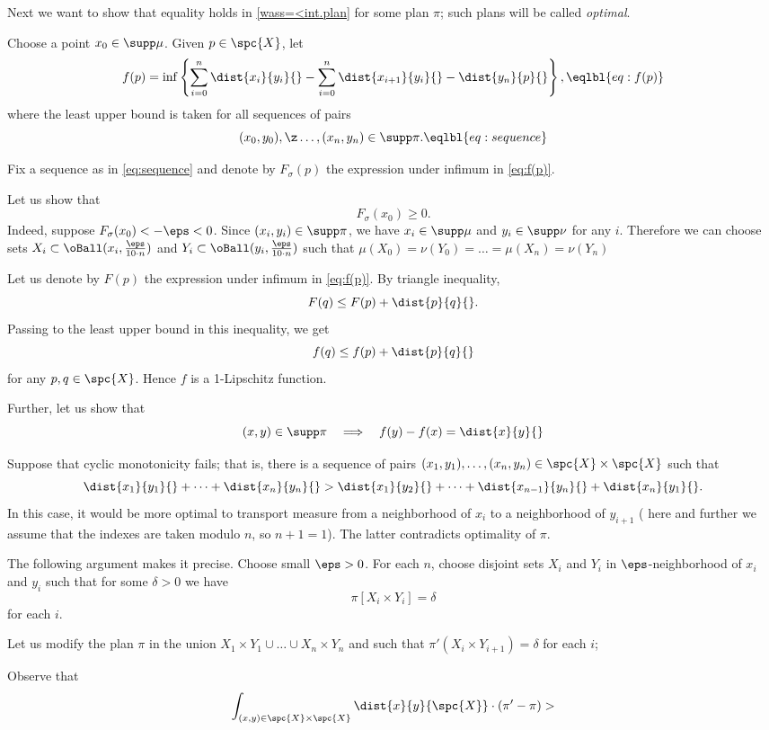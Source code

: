 Next we want to show that equality holds in \ref{wass=<int.plan} for some plan $\pi$; such plans will be called \emph{optimal}.


Choose a point $x_0\in \supp\mu$.
Given  $p\in \spc{X}$,
let
\[f(p)=\inf\left\{\sum_{i=0}^n\dist{x_i}{y_i}{}-\sum_{i=0}^n\dist{x_{i+1}}{y_i}{}-\dist{y_n}{p}{}\right\},
\eqlbl{eq:f(p)}\]
where the least upper bound is taken for all sequences of pairs 
\[(x_0,y_0),\z\dots,(x_n,y_n)\in \supp\pi.\eqlbl{eq:sequence}\]

Fix a sequence as in \ref{eq:sequence} and  denote by $F_\sigma(p)$ the expression under infimum in \ref{eq:f(p)}.

Let us show that 
\[F_\sigma(x_0)\ge 0.\]
Indeed, suppose $F_\sigma(x_0)<-\eps<0$.
Since $(x_i,y_i)\in \supp\pi$, we have $x_i\in\supp\mu$ and $y_i\in\supp\nu$ for any $i$.
Therefore we can choose sets $X_i\subset \oBall(x_i,\tfrac{\eps}{10\cdot n})$ and $Y_i\subset \oBall(y_i,\tfrac{\eps}{10\cdot n})$ such that 
$\mu(X_0)=\nu(Y_0)=\dots=\mu(X_n)=\nu(Y_n)$



Let us denote by $F(p)$ the expression under infimum in \ref{eq:f(p)}.
By triangle inequality, 
\[F(q)\le F(p)+\dist{p}{q}{}.\]
Passing to the least upper bound in this inequality, we get
\[f(q)\le f(p)+\dist{p}{q}{}\]
for any $p,q\in\spc{X}$.
Hence $f$ is a 1-Lipschitz function.

Further, let us show that
\[(x,y)\in\supp\pi
\quad\Longrightarrow\quad
f(y)-f(x)=\dist{x}{y}{}\]





Suppose that cyclic monotonicity fails;
that is, there is a sequence of pairs $(x_1,y_1),\dots,(x_n,y_n)\in\spc{X}\times\spc{X}$ such that
\[\dist{x_1}{y_1}{}+\dots+\dist{x_n}{y_n}{}
>
\dist{x_1}{y_2}{}+\dots+\dist{x_{n-1}}{y_n}{}+\dist{x_{n}}{y_1}{}.\]
In this case, it would be more optimal to transport measure from a neighborhood of $x_i$ to a neighborhood of $y_{i+1}$ (
here and further we assume that the indexes are taken modulo $n$, so $n+1=1$).
The latter contradicts optimality of $\pi$.

The following argument makes it precise.
Choose small $\eps>0$.
For each $n$,
choose disjoint sets $X_i$ and $Y_i$ in $\eps$-neighborhood of $x_i$ and $y_i$
such that for some $\delta>0$ we have 
\[\pi [X_i\times Y_i]=\delta\]
for each $i$.

Let us modify the plan $\pi$ in the union $X_1\times Y_1 \cup\dots\cup X_n\times Y_n$ and such that 
$\pi'(X_i\times Y_{i+1})=\delta$ for each $i$;


Observe that
\[\int_{(x,y)\in\spc{X}\times\spc{X}}\dist{x}{y}{\spc{X}}\cdot(\pi'-\pi)>\]
\qeds

